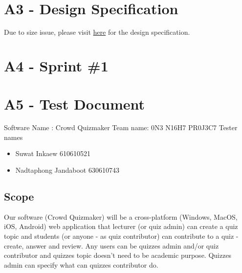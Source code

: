 \documentclass[ 10pt]{report}
\begin{document}

    \chapter{A3 - Design Specification}
    Due to size issue, please visit \href{https://github.com/IkaWaAyuMu/261361-Project/blob/main/documents/A3/A3 1.0.pdf}{here} for the design specification.

    \chapter{A4 - Sprint \#1}
    \pagebreak
    

    \chapter{A5 - Test Document}

    Software Name : Crowd Quizmaker
    Team name: 0N3 N16H7 PR0J3C7
    Tester names
    \begin{itemize}
        \item Suwat Inkaew 610610521
        \item Nadtaphong Jandaboot 630610743
    \end{itemize}
    \section{Scope}
        Our software (Crowd Quizmaker) will be a cross-platform (Windows, MacOS, iOS, Android) web application that lecturer (or quiz admin) can create a quiz topic and students (or anyone - as quiz contributor) can contribute to a quiz - create, answer and review. Any users can be quizzes admin and/or quiz contributor and quizzes topic doesn’t need to be academic purpose. Quizzes admin can specify what can quizzes contributor do.
\end{document}
